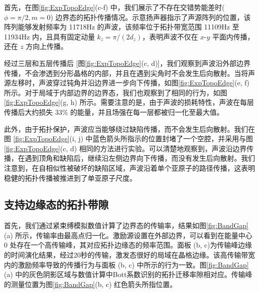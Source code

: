 首先，在图\ref{fig:ExpTopoEdge}(c-f) 中，我们展示了不存在交错势能差时($\phi = \pi/2, m=0$) 边界态的拓扑传播情况。示意扬声器指示了声源阵列的位置，该阵列能够发射频率为 11718Hz 的声波，该频率位于拓扑带宽范围 11109Hz 至 11934Hz 内，且具有固定动量 $k_z = \pi/(2d_z)$，表明声波不仅在 $x$-$y$ 平面内传播，还在 $z$ 方向上传播。

经过三层和五层传播后 [图\ref{fig:ExpTopoEdge}(c, d)]，我们观察到声波沿外部边界传播，不会渗透到分形晶格的内部，并且在遇到尖角时不会发生后向散射。当将声源左移时，声波穿过钝角并沿边界进一步向下传播，如图\ref{fig:ExpTopoEdge}(e, f) 所示。对于局域于内部边界的边界态，我们也观察到了相同的行为，如图\ref{fig:ExpTopoEdge}(g, h) 所示。需要注意的是，由于声波的损耗特性，声波在每层传播后大约损失 $33\%$ 的能量，并且场强在每一层都被归一化至最大值。

此外，由于拓扑保护，声波应当能够绕过缺陷传播，而不会发生后向散射。我们在图 \ref{fig:ExpTopoEdge}(i, j) 中蓝色箭头所指示的位置封堵了一个空腔，并采用与图\ref{fig:ExpTopoEdge}(c, d) 相同的方法进行实验。可以清楚地观察到，声波沿边界传播，在遇到顶角和缺陷后，继续沿左侧边界向下传播，而没有发生后向散射。我们注意到，在自相似性被破坏的缺陷区域，声波沿着单个亚原子的路径传播，这表明稳健的拓扑传播被推进到了单亚原子尺度。

\subsection{支持边缘态的拓扑带隙}
首先，我们通过紧束缚模拟数值计算了边界态的传输率，结果如图\ref{fig:BandGap}(a) 所示，传输率由最高点归一化。激励源设置在外部边界，可以看到在能量中心 0 处存在一个高传输峰，其对应拓扑边缘态的频率范围。面板 (b, c)为传输峰边缘的时间演化结果，经过20秒的传输，激发态很好的局域在晶格边缘。该高传输带宽内的激励频率导致的传播行为与面板 (b, c) 中所示的行为一致。图\ref{fig:BandGap}(a) 中的灰色阴影区域与数值计算中Bott系数识别的拓扑迁移率隙相对应。传输峰的测量位置为图\ref{fig:BandGap}(b, c) 红色箭头所指位置。

